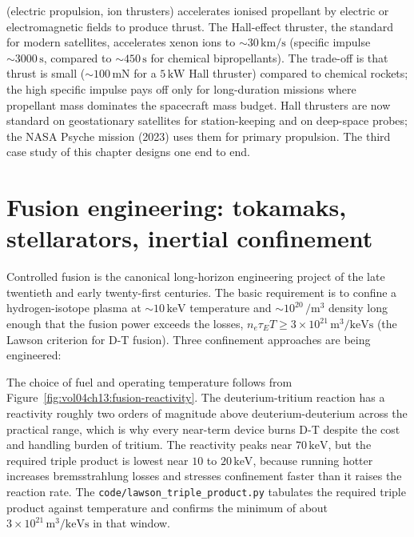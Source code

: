  (electric propulsion, ion thrusters)
accelerates ionised propellant by electric or electromagnetic fields
to produce thrust. The Hall-effect thruster, the standard for modern
satellites, accelerates xenon ions to $\sim 30\,\si{\kilo\meter\per
\second}$ (specific impulse $\sim 3000\,\si{\second}$, compared to
$\sim 450\,\si{\second}$ for chemical bipropellants). The trade-off
is that thrust is small ($\sim 100\,\si{\milli\newton}$ for a
$5\,\si{\kilo\watt}$ Hall thruster) compared to chemical rockets;
the high specific impulse pays off only for long-duration missions
where propellant mass dominates the spacecraft mass budget. Hall
thrusters are now standard on geostationary satellites for
station-keeping and on deep-space probes; the NASA Psyche mission
(2023) uses them for primary propulsion. The third case study of this
chapter designs one end to end.

\section{Fusion engineering: tokamaks, stellarators, inertial confinement}

Controlled fusion is the canonical long-horizon engineering project
of the late twentieth and early twenty-first centuries. The basic
requirement is to confine a hydrogen-isotope plasma at $\sim 10\,\si{
\kilo\electronvolt}$ temperature and $\sim 10^{20}\,\si{\per\meter
\cubed}$ density long enough that the fusion power exceeds the
losses, $n_{e}\tau_{E}T \ge 3\times 10^{21}\,\si{\meter\cubed\per
\kilo\electronvolt\second}$ (the Lawson criterion for D-T fusion).
Three confinement approaches are being engineered:



The choice of fuel and operating temperature follows from
Figure~\ref{fig:vol04ch13:fusion-reactivity}. The deuterium-tritium
reaction has a reactivity roughly two orders of magnitude above
deuterium-deuterium across the practical range, which is why every
near-term device burns D-T despite the cost and handling burden of
tritium. The reactivity peaks near $70\,\si{\kilo\electronvolt}$, but the
required triple product is lowest near $10$ to $20\,\si{\kilo\electronvolt}$,
because running hotter increases bremsstrahlung losses and stresses
confinement faster than it raises the reaction rate. The
\texttt{code/lawson\_triple\_product.py} tabulates the required triple
product against temperature and confirms the minimum of about $3\times
10^{21}\,\si{\meter\cubed\per\kilo\electronvolt\second}$ in that window.

